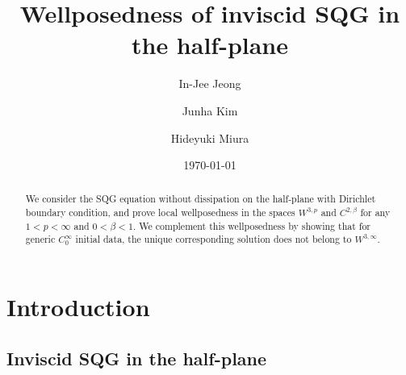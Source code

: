 \documentclass[10pt]{amsart}
\theoremstyle{definition}
\theoremstyle{remark}
\numberwithin{equation}{section}
\newcommand{\0}{\emptyset}
\begin{document}
	
	\title{Wellposedness of inviscid SQG in the half-plane}%


	\date{\today}
	
	\renewcommand{\thefootnote}{\fnsymbol{footnote}}
	
	
	\renewcommand{\thefootnote}{\arabic{footnote}}
	
	
	
	
	\author{In-Jee Jeong}
	\address{Department of Mathematical Sciences and RIM, Seoul National University, 1 Gwanak-ro, Gwanak-gu, Seoul 08826, South Korea.}
	
	
	
	\author{Junha Kim}
	\address{Department of Mathematics, Ajou University.}
	
	
	\author{Hideyuki Miura}
	\address{Department of Mathematics, Tokyo Institute of Technology.}
	
	
	\maketitle
	
	
	\begin{abstract}
		We consider the SQG equation without dissipation on the half-plane with Dirichlet boundary condition, and prove local wellposedness in the spaces $W^{3,p}$ and $C^{2,\beta}$ for any $1<p<\infty$ and $0<\beta<1$. We complement this wellposedness by showing that for generic $C^{\infty}_{0}$ initial data, the unique corresponding  solution does not belong to $W^{3,\infty}$.  
	\end{abstract}
	
	
	
	\section{Introduction}
	
	
	
	\subsection{Inviscid SQG in the half-plane}
	
\end{document}

